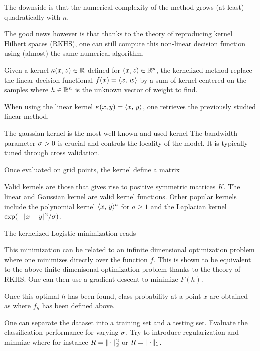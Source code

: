 The downside is that the numerical complexity of the method grows
(at least) quadratically with $n$.

The good news however is that thanks to the theory of reproducing kernel Hilbert spaces
(RKHS), one can still compute this non-linear decision
function using (almost) the same numerical algorithm.

Given a kernel $ \kappa(x,z) \in \mathbb{R} $ defined for $(x,z) \in \mathbb{R}^p$,
the kernelized method replace the linear decision functional $f(x) =
\langle x,\,w\rangle$ by a sum of kernel centered on the samples
where $h \in \mathbb{R}^n$ is the unknown vector of weight to find.

When using the linear kernel $\kappa(x,y)=\langle x,\,y\rangle$, one retrieves
the previously studied linear method.


The gaussian kernel is the most well known and used kernel
The bandwidth parameter $\sigma>0$ is crucial and controls the locality of
the model. It is typically tuned through cross validation.


Once evaluated on grid points, the kernel define a matrix

Valid kernels are those that gives rise to positive symmetric matrices
$K$. The linear and Gaussian kernel are valid kernel functions. Other
popular kernels include the polynomial kernel $ \langle x,\,y\rangle^a $ for $a
\geq 1$ and the Laplacian kernel $ \exp( -|\!| x-y |\!|^2/\sigma ) $.

The kernelized Logistic minimization reads

This minimization can be related to an infinite dimensional optimization
problem where one minimizes directly over the function $f$. This
is shown to be equivalent to the above finite-dimenisonal optimization problem
thanks to the theory of RKHS.
One can then use a gradient descent to minimize $F(h)$.


Once this optimal $h$ has been found, class probability at a point
$x$ are obtained as
where $f_h$ has been defined above.




One can separate the dataset into a training set and a testing set. Evaluate the classification performance
for varying $\sigma$. Try to introduce regularization and minmize
where for instance $R=|\!| \cdot |\!|_2^2$ or  $R=|\!| \cdot |\!|_1$.


